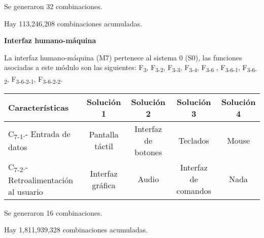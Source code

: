 Se generaron 32 combinaciones.\par
\par Hay 113,246,208 combinaciones acumuladas.\par

\textbf{Interfaz humano-m\'aquina}

La interfaz humano-m\'aquina (M7) pertenece al sistema 0 (S0), las funciones asociadas a este m\'odulo son las siguientes: F\textsubscript{3}, F\textsubscript{3-2}, F\textsubscript{3-3}, F\textsubscript{3-4}, F\textsubscript{3-6}
, F\textsubscript{3-6-1}, F\textsubscript{3-6-2}, F\textsubscript{3-6-2-1}, F\textsubscript{3-6-2-2}.



\begin{center}
\begin{adjustbox}{angle=90}
\begin{tabular}{|l|c|c|c|c|}
\hline
\textbf{Caracter\'isticas} &
 \textbf{Soluci\'on 1} &
 \textbf{Soluci\'on 2} &
 \textbf{Soluci\'on 3} &
 \textbf{Soluci\'on 4}\\\hline
C\textsubscript{7-1}.- Entrada de datos &
 Pantalla t\'actil &
 Interfaz de botones &
 Teclados &
 Mouse\\\hline
C\textsubscript{7-2}.- Retroalimentaci\'on al usuario &
 Interfaz gr\'afica &
 Audio &
 Interfaz de comandos &
 Nada\\\hline
\end{tabular}
\end{adjustbox}
\end{center}

Se generaron 16 combinaciones.\par
\par Hay 1,811,939,328 combinaciones acumuladas.

